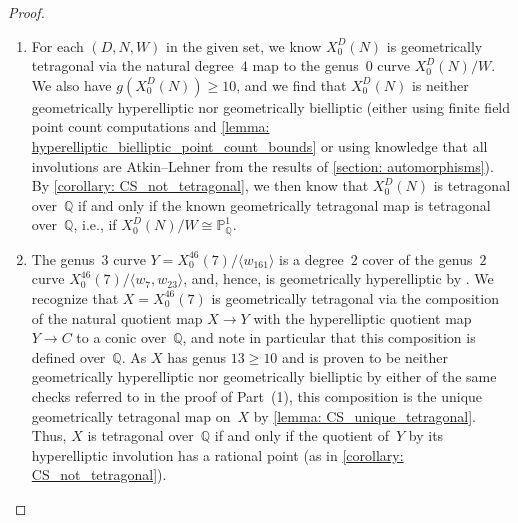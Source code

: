 \documentclass[11pt,reqno]{amsart}
\newcommand{\Q}{\mathbb{Q}}
\renewcommand{\P}{\mathbb{P}}
\theoremstyle{definition}
\newcommand{\Pietro}[1]{{\color{orange}{??Pietro: #1}}} %
\newcommand{\freddy}[1]{{\color{purple}{$\spadesuit$ Freddy: #1}}}
\begin{document}
\begin{proof}
\phantom{a}
\begin{enumerate}
    \item For each $(D,N,W)$ in the given set, we know $X_0^D(N)$ is geometrically tetragonal via the natural degree~$4$ map to the genus~$0$ curve $X_0^D(N)/W$. We also have $g(X_0^D(N)) \geq 10$, and we find that $X_0^D(N)$ is neither geometrically hyperelliptic nor geometrically bielliptic (either using finite field point count computations and \cref{lemma: hyperelliptic_bielliptic_point_count_bounds} or using knowledge that all involutions are Atkin--Lehner from the results of \cref{section: automorphisms}). By \cref{corollary: CS_not_tetragonal}, we then know that $X_0^D(N)$ is tetragonal over~$\Q$ if and only if the known geometrically tetragonal map is tetragonal over~$\Q$, i.e., if $X_0^D(N)/W \cong \P^1_\Q$. %

    \item The genus~$3$ curve $Y = X_0^{46}(7)/\langle w_{161} \rangle$ is a degree~$2$ cover of the genus~$2$ curve $X_0^{46}(7)/\langle w_7, w_{23} \rangle$, and, hence, is geometrically hyperelliptic by \cite[Theorem~3.4]{Pol06}. We recognize that $X = X_0^{46}(7)$ is geometrically tetragonal via the composition of the natural quotient map $X \to Y$ with the hyperelliptic quotient map $Y \to C$ to a conic over~$\Q$, and note in particular that this composition is defined over~$\mathbb{Q}$. As $X$ has genus $13 \geq 10$ and is proven to be neither geometrically hyperelliptic nor geometrically bielliptic by either of the same checks referred to in the proof of Part~(1), this composition is the unique geometrically tetragonal map on~$X$ by \cref{lemma: CS_unique_tetragonal}. Thus, $X$ is tetragonal over~$\Q$ if and only if the quotient of~$Y$ by its hyperelliptic involution has a rational point (as in \cref{corollary: CS_not_tetragonal}). \qedhere
\end{enumerate}
\end{proof}
\end{document}
